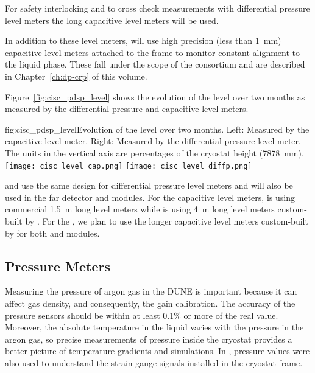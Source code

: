 For %
safety interlocking and to cross check measurements with differential pressure level meters the long capacitive level meters will be used. 


In addition to these level meters,  will use high precision (less than 1~mm) capacitive level meters attached to the  frame to monitor constant  alignment to the liquid phase. These fall under the scope of the  consortium and are described in Chapter~\ref{ch:dp-crp} of this  volume.

Figure~\ref{fig:cisc_pdsp_level} shows the evolution of the   level over two months as measured by the differential pressure and capacitive level meters. 

\begin{dunefigure}{fig:cisc_pdsp_level}{Evolution of the  \lar level over two months. Left: Measured by the capacitive level meter. Right: Measured by the differential pressure level meter. The units in the vertical axis are percentages of the cryostat height (\SI{7878}{mm}).}
  \texttt{[image: cisc\_level\_cap.png]}%
  \hspace*{1cm}
  \texttt{[image: cisc\_level\_diffp.png]}%
\end{dunefigure}

 and  use the same design for differential pressure level meters and will also be used in the far detector  and  modules. For the capacitive level meters,  is using commercial 1.5~m long level meters while  is using 4~m long level meters custom-built by . For the  , we plan to use the longer capacitive level meters custom-built by  for both  and  modules.



\subsection{Pressure Meters}
\label{sec:fdgen-slow-cryo-press-meter}


Measuring the pressure of argon gas in the DUNE  is important because it can affect gas density, and consequently, the  gain calibration. The accuracy of the pressure sensors should be within at least 0.1\% or more of the real value. %
Moreover, the absolute temperature in the liquid varies with the pressure in the argon gas, so precise measurements of pressure inside the cryostat provides a better picture of temperature gradients and  simulations. In , pressure values were also used to understand the strain gauge signals installed in the cryostat frame.

